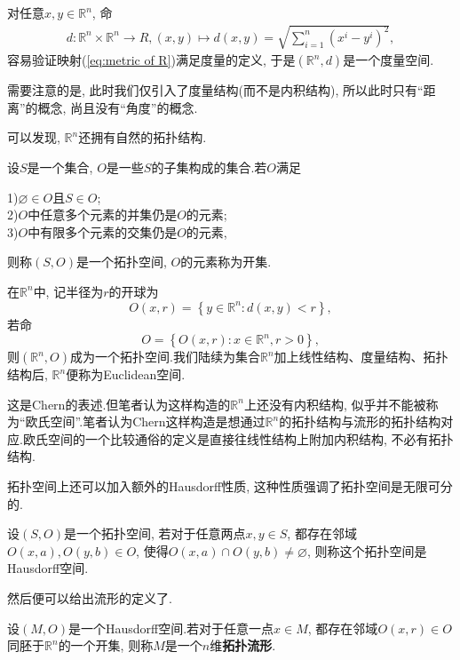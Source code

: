 对任意$x,y\in \mathbb{R}^n$, 命
\begin{equation}\label{eq:metric of R}
  \begin{split}
    d:\mathbb{R}^n\times \mathbb{R}^n\rightarrow R,(x,y)\mapsto d(x,y)=\sqrt{\sum_{i=1}^n(x^i-y^i)^2},
  \end{split}
\end{equation}
容易验证映射(\ref{eq:metric of R})满足度量的定义, 于是$(\mathbb{R}^n,d)$是一个度量空间.
\begin{remark}
  需要注意的是, 此时我们仅引入了度量结构(而不是内积结构), 所以此时只有“距离”的概念, 尚且没有“角度”的概念.
\end{remark}
可以发现, $\mathbb{R}^n$还拥有自然的拓扑结构.
\begin{definition}
  设$S$是一个集合, $O$是一些$S$的子集构成的集合.若$O$满足

  1)$\varnothing\in O$且$S\in O$;\\
  2)$O$中任意多个元素的并集仍是$O$的元素;\\
  3)$O$中有限多个元素的交集仍是$O$的元素,

  则称$(S,O)$是一个拓扑空间, $O$的元素称为开集.
\end{definition}
在$\mathbb{R}^n$中, 记半径为$r$的开球为$$O(x,r)=\left\{y\in\mathbb{R}^n:d(x,y)<r\right\},$$若命
$$O=\left\{O(x,r):x\in\mathbb{R}^n,r>0\right\},$$
则$(\mathbb{R}^n,O)$成为一个拓扑空间.我们陆续为集合$\mathbb{R}^n$加上线性结构、度量结构、拓扑结构后, $\mathbb{R}^n$便称为Euclidean空间.
\begin{remark}
  这是Chern的表述.但笔者认为这样构造的$\mathbb{R}^n$上还没有内积结构, 似乎并不能被称为“欧氏空间”.笔者认为Chern这样构造是想通过$\mathbb{R}^n$的拓扑结构与流形的拓扑结构对应.欧氏空间的一个比较通俗的定义是直接往线性结构上附加内积结构, 不必有拓扑结构.
\end{remark}
拓扑空间上还可以加入额外的Hausdorff性质, 这种性质强调了拓扑空间是无限可分的.
\begin{definition}
  设$(S,O)$是一个拓扑空间, 若对于任意两点$x,y\in S$, 都存在邻域$O(x,a),O(y,b)\in O$, 使得$O(x,a)\cap O(y,b)\neq \varnothing$, 则称这个拓扑空间是Hausdorff空间.
\end{definition}
然后便可以给出流形的定义了.
\begin{definition}
  设$(M,O)$是一个Hausdorff空间.若对于任意一点$x\in M$, 都存在邻域$O(x,r)\in O$同胚于$\mathbb{R}^n$的一个开集, 则称$M$是一个$n$维\textbf{拓扑流形}.
\end{definition}

